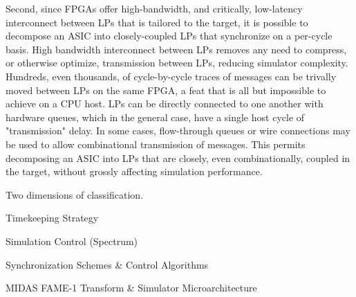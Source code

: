 Second, since FPGAs offer high-bandwidth, and critically, low-latency
interconnect between LPs that is tailored to the target, it is possible to
decompose an ASIC into closely-coupled LPs that synchronize on a per-cycle
basis. High bandwidth interconnect between LPs removes any need to compress, or
otherwise optimize, transmission between LPs, reducing simulator complexity.
Hundreds, even thousands, of cycle-by-cycle traces of messages can be trivally
moved between LPs on the same FPGA, a feat that is all but impossible to
achieve on a CPU host. LPs can be directly connected to one another with
hardware queues, which in the general case, have a single host cycle of
"transmission" delay. In some cases, flow-through queues or wire connections
may be used to allow combinational transmission of messages. This permits
decomposing an ASIC into LPs that are closely, even combinationally, coupled in
the target, without grossly affecting simulation performance.













Two dimensions of classification.

Timekeeping Strategy

Simulation Control (Spectrum)

Synchronization Schemes \& Control Algorithms

MIDAS FAME-1 Transform \& Simulator Microarchitecture

